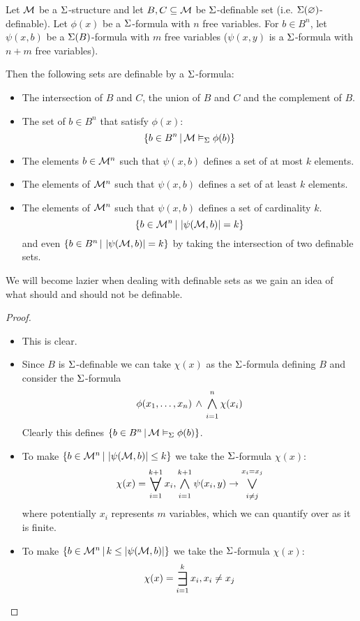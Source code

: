 \begin{lem}
    Let $\mathcal{M}$ be a $\Sigma$-structure and let $B,C \subseteq \mathcal{M}$ be $\Sigma$-definable
    set (i.e. $\Sigma(\varnothing)$-definable).
    Let $\phi(x)$ be a $\Sigma$-formula with $n$ free variables.
    For $b \in B^n$, let $\psi(x,b)$ be a $\Sigma(B)$-formula 
    with $m$ free variables ($\psi(x,y)$
    is a $\Sigma$-formula with $n+m$ free variables).

    Then the following sets are definable by a $\Sigma$-formula:
    \begin{itemize}
        \item The intersection of $B$ and $C$, the union of $B$ and $C$ and
            the complement of $B$.
        \item The set of $b \in B^n$ that satisfy $\phi(x)$:
            \[\left\{b \in B^n \,|\, \mathcal{M} \vDash_{\Sigma} \phi(b)\right\}\]
        \item The elements $b \in \mathcal{M}^n$ such that $\psi(x,b)$ defines a set of 
            at most $k$ elements.
        \item The elements of $\mathcal{M}^n$ such that $\psi(x,b)$ defines a set of 
            at least $k$ elements.
        \item The elements of $\mathcal{M}^n$ such that $\psi(x,b)$ defines a set of 
            cardinality $k$.
            \[\left\{b \in \mathcal{M}^n \,|\, \left\vert \psi(\mathcal{M},b) \right\vert = k\right\}\]
            and even $\left\{b \in B^n \,|\, \left\vert \psi(\mathcal{M},b) \right\vert = k\right\}$ by 
            taking the intersection of two definable sets.
    \end{itemize}
    We will become lazier when dealing with definable sets as we gain an idea 
    of what should and should not be definable.
\end{lem}
\begin{proof}
    \begin{itemize}
        \item This is clear.
        \item 
        Since $B$ is $\Sigma$-definable we can take $\chi(x)$ as the 
        $\Sigma$-formula defining $B$
        and consider the $\Sigma$-formula 
        \[\phi(x_1,\dots,x_n) \AND \bigand{i = 1}{n} \chi(x_i)\]
        Clearly this defines $\left\{b \in B^n \,|\, \mathcal{M} \vDash_{\Sigma} \phi(b)\right\}$.
        \item 
        To make $\left\{b \in \mathcal{M}^n \,|\, \left\vert \psi(\mathcal{M},b) \right\vert \leq k\right\}$
        we take the $\Sigma$-formula $\chi(x)$:
        \[
            \chi(x) = \bigforall{i = 1}{k + 1} x_i,
            \bigand{i = 1}{k + 1} \psi(x_i,y) \to \bigor{i \ne j}{x_i = x_j}
        \]
        where potentially $x_i$ represents $m$ variables, which we can 
        quantify over as it is finite.
        \item 
        To make $\left\{b \in \mathcal{M}^n \,|\, k \leq \left\vert \psi(\mathcal{M},b) \right\vert\right\}$
        we take the $\Sigma$-formula $\chi(x)$:
        \[
            \chi(x) = \bigexists{i = 1}{k} x_i, {x_i \ne x_j}
        \]
    \end{itemize}
\end{proof}

